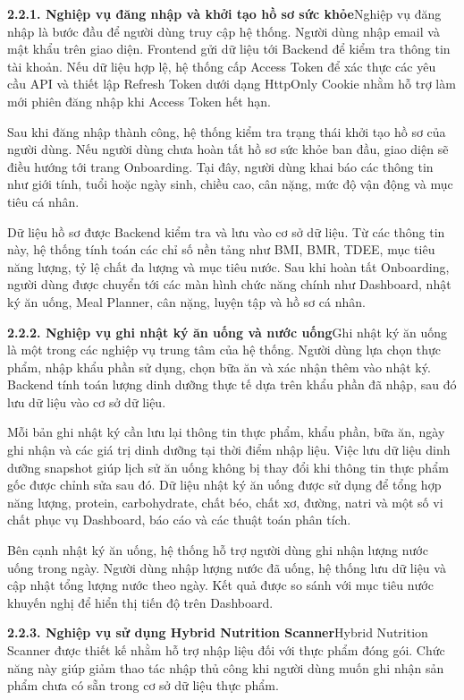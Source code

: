 \textbf{2.2.1. Nghiệp vụ đăng nhập và khởi tạo hồ sơ sức khỏe}Nghiệp vụ đăng nhập là bước đầu để người dùng truy cập hệ thống. Người dùng nhập email và mật khẩu trên giao diện. Frontend gửi dữ liệu tới Backend để kiểm tra thông tin tài khoản. Nếu dữ liệu hợp lệ, hệ thống cấp Access Token để xác thực các yêu cầu API và thiết lập Refresh Token dưới dạng HttpOnly Cookie nhằm hỗ trợ làm mới phiên đăng nhập khi Access Token hết hạn.

Sau khi đăng nhập thành công, hệ thống kiểm tra trạng thái khởi tạo hồ sơ của người dùng. Nếu người dùng chưa hoàn tất hồ sơ sức khỏe ban đầu, giao diện sẽ điều hướng tới trang Onboarding. Tại đây, người dùng khai báo các thông tin như giới tính, tuổi hoặc ngày sinh, chiều cao, cân nặng, mức độ vận động và mục tiêu cá nhân.

Dữ liệu hồ sơ được Backend kiểm tra và lưu vào cơ sở dữ liệu. Từ các thông tin này, hệ thống tính toán các chỉ số nền tảng như BMI, BMR, TDEE, mục tiêu năng lượng, tỷ lệ chất đa lượng và mục tiêu nước. Sau khi hoàn tất Onboarding, người dùng được chuyển tới các màn hình chức năng chính như Dashboard, nhật ký ăn uống, Meal Planner, cân nặng, luyện tập và hồ sơ cá nhân.

\textbf{2.2.2. Nghiệp vụ ghi nhật ký ăn uống và nước uống}Ghi nhật ký ăn uống là một trong các nghiệp vụ trung tâm của hệ thống. Người dùng lựa chọn thực phẩm, nhập khẩu phần sử dụng, chọn bữa ăn và xác nhận thêm vào nhật ký. Backend tính toán lượng dinh dưỡng thực tế dựa trên khẩu phần đã nhập, sau đó lưu dữ liệu vào cơ sở dữ liệu.

Mỗi bản ghi nhật ký cần lưu lại thông tin thực phẩm, khẩu phần, bữa ăn, ngày ghi nhận và các giá trị dinh dưỡng tại thời điểm nhập liệu. Việc lưu dữ liệu dinh dưỡng snapshot giúp lịch sử ăn uống không bị thay đổi khi thông tin thực phẩm gốc được chỉnh sửa sau đó. Dữ liệu nhật ký ăn uống được sử dụng để tổng hợp năng lượng, protein, carbohydrate, chất béo, chất xơ, đường, natri và một số vi chất phục vụ Dashboard, báo cáo và các thuật toán phân tích.

Bên cạnh nhật ký ăn uống, hệ thống hỗ trợ người dùng ghi nhận lượng nước uống trong ngày. Người dùng nhập lượng nước đã uống, hệ thống lưu dữ liệu và cập nhật tổng lượng nước theo ngày. Kết quả được so sánh với mục tiêu nước khuyến nghị để hiển thị tiến độ trên Dashboard.

\textbf{2.2.3. Nghiệp vụ sử dụng Hybrid Nutrition Scanner}Hybrid Nutrition Scanner được thiết kế nhằm hỗ trợ nhập liệu đối với thực phẩm đóng gói. Chức năng này giúp giảm thao tác nhập thủ công khi người dùng muốn ghi nhận sản phẩm chưa có sẵn trong cơ sở dữ liệu thực phẩm.

